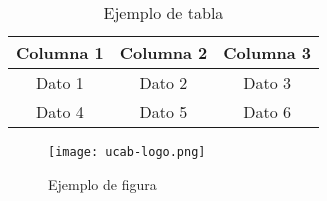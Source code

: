 
\lipsum

\begin{table}
  \centering
  \begin{tabular}{|c|c|c|}
    \hline
    Columna 1 & Columna 2 & Columna 3 \\
    \hline
    Dato 1    & Dato 2    & Dato 3    \\
    \hline
    Dato 4    & Dato 5    & Dato 6    \\
    \hline
  \end{tabular}
  \label{tab:example}
  \caption{Ejemplo de tabla}
\end{table}

\begin{figure}
  \centering
  \texttt{[image: ucab-logo.png]}
  \caption{Ejemplo de figura}
  \label{fig:example}
\end{figure}
